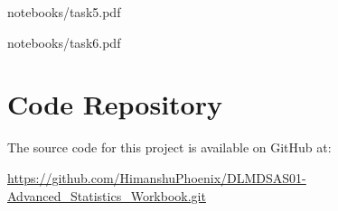 
    {notebooks/task5.pdf}


    {notebooks/task6.pdf}

\chapter{Code Repository}
\vspace*{-25pt}
The source code for this project is available on GitHub at: 

\url{https://github.com/HimanshuPhoenix/DLMDSAS01-Advanced_Statistics_Workbook.git}

\printbibliography[heading=bibintoc]
\vspace*{-25pt}